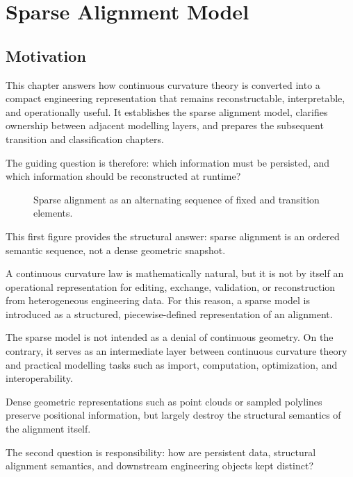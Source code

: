 
\chapter{Sparse Alignment Model}

\section*{Motivation}

This chapter answers how continuous curvature theory is converted into a
compact engineering representation that remains reconstructable,
interpretable, and operationally useful. It establishes the sparse
alignment model, clarifies ownership between adjacent modelling layers,
and prepares the subsequent transition and classification chapters.

The guiding question is therefore: which information must be persisted,
and which information should be reconstructed at runtime?

\begin{figure}[htbp]
\centering

\caption{Sparse alignment as an alternating sequence of fixed and transition elements.}
\label{fig:sparse-model-structure}
\end{figure}

This first figure provides the structural answer: sparse alignment is an
ordered semantic sequence, not a dense geometric snapshot.

A continuous curvature law is mathematically natural, but it is not by
itself an operational representation for editing, exchange, validation,
or reconstruction from heterogeneous engineering data.
For this reason, a sparse model is introduced as a structured,
piecewise-defined representation of an alignment.

The sparse model is not intended as a denial of continuous geometry.
On the contrary, it serves as an intermediate layer between continuous
curvature theory and practical modelling tasks such as import,
computation, optimization, and interoperability.

Dense geometric representations such as point clouds or sampled
polylines preserve positional information, but largely destroy the
structural semantics of the alignment itself.

The second question is responsibility: how are persistent data,
structural alignment semantics, and downstream engineering objects kept
distinct?

